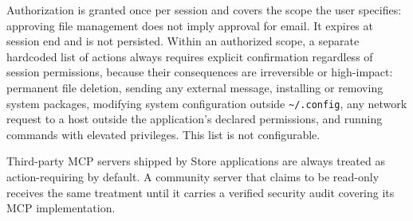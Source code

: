 Authorization is granted once per session and covers the scope the user
specifies: approving file management does not imply approval for email. It
expires at session end and is not persisted. Within an authorized scope, a
separate hardcoded list of actions always requires explicit confirmation
regardless of session permissions, because their consequences are irreversible
or high-impact: permanent file deletion, sending any external message,
installing or removing system packages, modifying system configuration outside
\texttt{\textasciitilde/.config}, any network request to a host outside the
application's declared permissions, and running commands with elevated
privileges. This list is not configurable.

Third-party MCP servers shipped by Store applications are always treated as
action-requiring by default. A community server that claims to be read-only
receives the same treatment until it carries a verified security audit covering
its MCP implementation.
